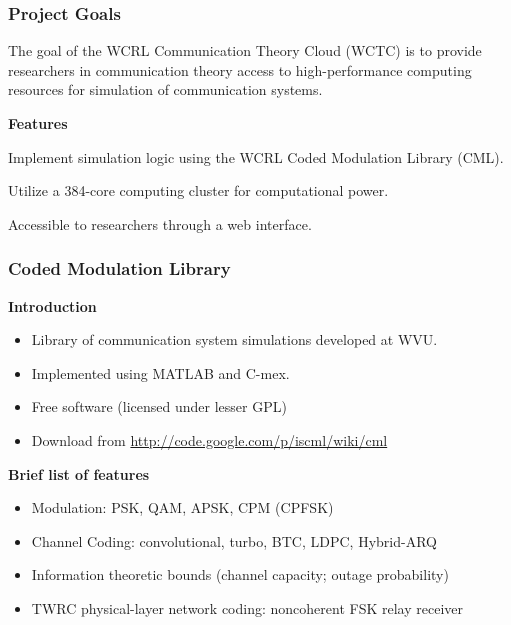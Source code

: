\begin{frame}
\frametitle{Project Goals}

The goal of the WCRL Communication Theory Cloud (WCTC) is to provide researchers in communication theory
access to high-performance computing resources for simulation of communication systems.

\vspace{5mm}

\textbf{Features}
\begin{itemize_loose}
\item Implement simulation logic using the WCRL Coded Modulation Library (CML).
\item Utilize a 384-core computing cluster for computational power.
\item Accessible to researchers through a web interface.
\end{itemize_loose}
\end{frame}


\begin{frame}
\frametitle{Coded Modulation Library}

\textbf{Introduction}
\begin{itemize}
\item Library of communication system simulations developed at WVU.
\item Implemented using MATLAB and C-mex.
\item Free software (licensed under lesser GPL)
\item Download from \url{http://code.google.com/p/iscml/wiki/cml}
\end{itemize}

\vspace{5mm}
\textbf{Brief list of features}
\begin{itemize}
\item Modulation: PSK, QAM, APSK, CPM (CPFSK)
\item Channel Coding: convolutional, turbo, BTC, LDPC, Hybrid-ARQ
\item Information theoretic bounds (channel capacity; outage probability)
\item TWRC physical-layer network coding: noncoherent FSK relay receiver
\end{itemize}
\end{frame}



